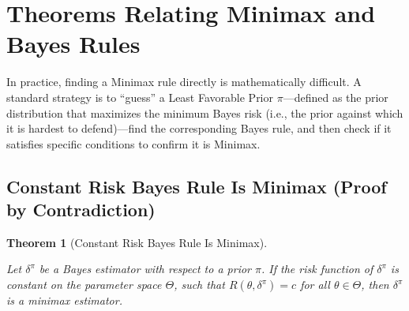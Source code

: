 \documentclass[
  letterpaper,
  DIV=11,
  numbers=noendperiod]{scrreprt}
\renewcommand{\[}{\begin{equation}}
\renewcommand{\]}{\end{equation}}
\theoremstyle{definition}
\theoremstyle{plain}
\theoremstyle{plain}
\theoremstyle{plain}
\newtheorem{theorem}{Theorem}[chapter]
\theoremstyle{definition}
\theoremstyle{plain}
\theoremstyle{remark}
\begin{document}
\section{Theorems Relating Minimax and Bayes
Rules}\label{theorems-relating-minimax-and-bayes-rules}

In practice, finding a Minimax rule directly is mathematically
difficult. A standard strategy is to ``guess'' a Least Favorable Prior
\(\pi\)---defined as the prior distribution that maximizes the minimum
Bayes risk (i.e., the prior against which it is hardest to
defend)---find the corresponding Bayes rule, and then check if it
satisfies specific conditions to confirm it is Minimax.

\subsection{Constant Risk Bayes Rule Is Minimax (Proof by
Contradiction)}\label{constant-risk-bayes-rule-is-minimax-proof-by-contradiction}

\begin{theorem}[Constant Risk Bayes Rule Is
Minimax]\protect\hypertarget{thm-minimax-constant}{}\label{thm-minimax-constant}

Let \(\delta^\pi\) be a Bayes estimator with respect to a prior \(\pi\).
If the risk function of \(\delta^\pi\) is constant on the parameter
space \(\Theta\), such that \(R(\theta, \delta^\pi) = c\) for all
\(\theta \in \Theta\), then \(\delta^\pi\) is a minimax estimator.

\end{theorem}
\end{document}
